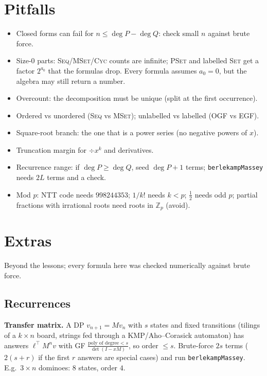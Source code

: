 \section{Pitfalls}
	\begin{itemize}[nosep,leftmargin=*]
	\item Closed forms can fail for $n\le\deg P-\deg Q$: check small $n$ against brute force.
	\item Size-$0$ parts: \textsc{Seq}/\textsc{MSet}/\textsc{Cyc} counts are infinite; \textsc{PSet} and labelled \textsc{Set} get a factor $2^{a_0}$ that the formulas drop. Every formula assumes $a_0=0$, but the algebra may still return a number.
	\item Overcount: the decomposition must be unique (split at the first occurrence).
	\item Ordered vs unordered (\textsc{Seq} vs \textsc{MSet}); unlabelled vs labelled (OGF vs EGF).
	\item Square-root branch: the one that is a power series (no negative powers of $x$).
	\item Truncation margin for $\div x^k$ and derivatives.
	\item Recurrence range: if $\deg P\ge\deg Q$, seed $\deg P+1$ terms; \texttt{berlekampMassey} needs $2L$ terms and a check.
	\item Mod $p$: NTT code needs $998244353$; $1/k!$ needs $k<p$; $\frac12$ needs odd $p$; partial fractions with irrational roots need roots in $\mathbb Z_p$ (avoid).
	\end{itemize}

\section{Extras}
	Beyond the lessons; every formula here was checked numerically against brute force.

	\subsection{Recurrences}
	\textbf{Transfer matrix.} A DP $v_{n+1}=Mv_n$ with $s$ states and fixed transitions (tilings of a $k\times n$ board, strings fed through a KMP/Aho--Corasick automaton) has answers $\ell^\top M^nv$ with GF $\frac{\text{poly of degree}<s}{\det(I-xM)}$, so order $\le s$. Brute-force $2s$ terms ($2(s+r)$ if the first $r$ answers are special cases) and run \texttt{berlekampMassey}. E.g.\ $3\times n$ dominoes: $8$ states, order $4$.


